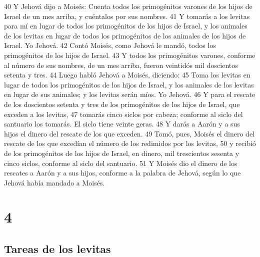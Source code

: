 40 Y Jehová dijo a Moisés: Cuenta todos los primogénitos varones de los hijos de Israel de un mes arriba, y cuéntalos por sus nombres.
41 Y tomarás a los levitas para mí en lugar de todos los primogénitos de los hijos de Israel, y los animales de los levitas en lugar de todos los primogénitos de los animales de los hijos de Israel. Yo Jehová.
42 Contó Moisés, como Jehová le mandó, todos los primogénitos de los hijos de Israel.
43 Y todos los primogénitos varones, conforme al número de sus nombres, de un mes arriba, fueron veintidós mil doscientos setenta y tres.
44 Luego habló Jehová a Moisés, diciendo:
45 Toma los levitas en lugar de todos los primogénitos de los hijos de Israel, y los animales de los levitas en lugar de sus animales; y los levitas serán míos. Yo Jehová.
46 Y para el rescate de los doscientos setenta y tres de los primogénitos de los hijos de Israel, que exceden a los levitas,
47 tomarás cinco siclos   por cabeza; conforme al siclo del santuario los tomarás. El siclo tiene veinte geras.
48 Y darás a Aarón y a sus hijos el dinero del rescate de los que exceden.
49 Tomó, pues, Moisés el dinero del rescate de los que excedían el número de los redimidos por los levitas,
50 y recibió de los primogénitos de los hijos de Israel, en dinero, mil trescientos sesenta y cinco siclos,  conforme al siclo del santuario.
51 Y Moisés dio el dinero de los rescates a Aarón y a sus hijos, conforme a la palabra de Jehová, según lo que Jehová había mandado a Moisés.

\chapter{4}

\section*{Tareas de los levitas }


